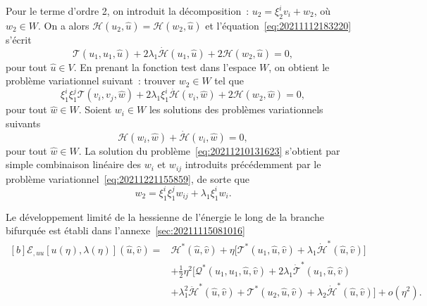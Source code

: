 \documentclass[12pt, final]{amsart}
\begin{document}
Pour le terme d'ordre 2, on introduit la décomposition~:
\(u_2=\xi_2^iv_i+w_2\), où \(w_2\in W\). On a alors
\(\mathcal H(u_2, \hat{u})=\mathcal H(w_2, \hat{u})\) et
l'équation~\eqref{eq:20211112183220} s'écrit
\begin{equation}
  \mathcal T(u_1, u_1, \hat{u})+2\lambda_1\dot{\mathcal H}(u_1, \hat{u})
  +2\mathcal H(w_2, \hat{u})=0,
\end{equation}
pour tout \(\hat{u}\in V\). En prenant la fonction test dans l'espace \(W\), on
obtient le problème variationnel suivant~: trouver \(w_2\in W\) tel
que
\begin{equation}
  \label{eq:20211210131623}
  \xi_1^i\xi_1^j\mathcal T(v_i, v_j, \hat{w})
  +2\lambda_1\xi_1^i\dot{\mathcal H}(v_i, \hat{w})
  +2\mathcal H(w_2, \hat{w})=0,
\end{equation}
pour tout \(\hat{w}\in W\). Soient \(w_i\in W\) les solutions des problèmes
variationnels suivants
\begin{equation}
  \mathcal H(w_i, \hat{w})+\dot{\mathcal H}(v_i, \hat{w})=0,
\end{equation}
pour tout \(\hat{w}\in W\). La solution du problème~\eqref{eq:20211210131623}
s'obtient par simple combinaison linéaire des \(w_i\) et \(w_{ij}\) introduits
précédemment par le problème variationnel~\eqref{eq:20211221155859}, de sorte
que
\begin{equation}
  w_2=\xi_1^i\xi_1^jw_{ij}+\lambda_1\xi_1^i w_i.
\end{equation}

Le développement limité de la hessienne de l'énergie le long de la
branche bifurquée est établi dans l'annexe~\ref{sec:20211115081016}
\begin{equation}
  \label{eq:20211115082025}
  \begin{aligned}[b]
    \mathcal E_{,uu}[u(\eta), \lambda(\eta)](\hat{u}, \hat{v})
    ={}&\mathcal H^\ast(\hat{u}, \hat{v})
    +\eta\bigl[\mathcal T^\ast(u_1, \hat{u}, \hat{v})
    +\lambda_1\dot{\mathcal H}^\ast(\hat{u}, \hat{v})\bigr]\\
    &+\tfrac12\eta^2\bigl[\mathcal Q^\ast(u_1, u_1, \hat{u}, \hat{v})
    +2\lambda_1\dot{\mathcal T}^\ast(u_1, \hat{u}, \hat{v})\\
    &+\lambda_1^2\ddot{\mathcal H}^\ast(\hat{u}, \hat{v})
    +\mathcal T^\ast(u_2, \hat{u}, \hat{v})
    +\lambda_2\dot{\mathcal H}^\ast(\hat{u}, \hat{v})\bigr]+o(\eta^2).
  \end{aligned}
\end{equation}
\end{document}

